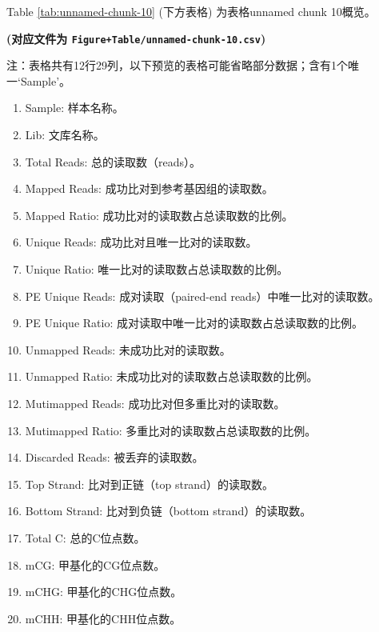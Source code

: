 \documentclass[
]{article}
\providecommand{\tightlist}{%
  \setlength{\itemsep}{0pt}\setlength{\parskip}{0pt}}
\begin{document}
Table \ref{tab:unnamed-chunk-10} (下方表格) 为表格unnamed chunk 10概览。

\textbf{(对应文件为 \texttt{Figure+Table/unnamed-chunk-10.csv})}

\begin{center}\begin{tcolorbox}[colback=gray!10, colframe=gray!50, width=0.9\linewidth, arc=1mm, boxrule=0.5pt]注：表格共有12行29列，以下预览的表格可能省略部分数据；含有1个唯一`Sample'。
\end{tcolorbox}
\end{center}
\begin{center}\begin{tcolorbox}[colback=gray!10, colframe=gray!50, width=0.9\linewidth, arc=1mm, boxrule=0.5pt]\begin{enumerate}\tightlist
\item Sample:  样本名称。
\item Lib:  文库名称。
\item Total Reads:  总的读取数（reads）。
\item Mapped Reads:  成功比对到参考基因组的读取数。
\item Mapped Ratio:  成功比对的读取数占总读取数的比例。
\item Unique Reads:  成功比对且唯一比对的读取数。
\item Unique Ratio:  唯一比对的读取数占总读取数的比例。
\item PE Unique Reads:  成对读取（paired-end reads）中唯一比对的读取数。
\item PE Unique Ratio:  成对读取中唯一比对的读取数占总读取数的比例。
\item Unmapped Reads:  未成功比对的读取数。
\item Unmapped Ratio:  未成功比对的读取数占总读取数的比例。
\item Mutimapped Reads:  成功比对但多重比对的读取数。
\item Mutimapped Ratio:  多重比对的读取数占总读取数的比例。
\item Discarded Reads:  被丢弃的读取数。
\item Top Strand:  比对到正链（top strand）的读取数。
\item Bottom Strand:  比对到负链（bottom strand）的读取数。
\item Total C:  总的C位点数。
\item mCG:  甲基化的CG位点数。
\item mCHG:  甲基化的CHG位点数。
\item mCHH:  甲基化的CHH位点数。

\end{enumerate}
\end{tcolorbox}
\end{center}
\end{document}
